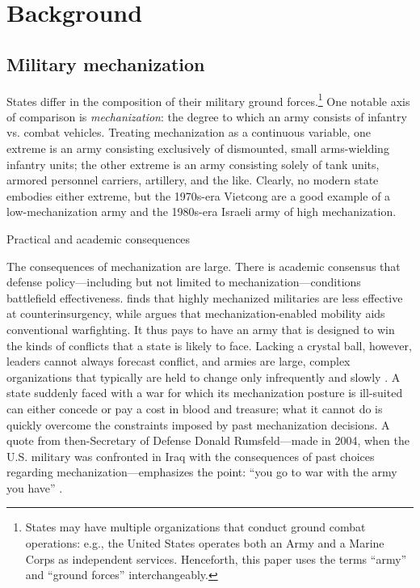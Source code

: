 \documentclass{article}
\begin{document}
\section{Background}

\subsection{Military mechanization}

States differ in the composition of their military ground forces.\footnote{States may have multiple organizations that
conduct ground combat operations: e.g., the United States operates both an Army
and a Marine Corps as independent services. Henceforth, this paper uses the
terms ``army'' and ``ground forces'' interchangeably.} One notable axis of comparison 
is \textit{mechanization}: the degree to which an army consists of infantry 
vs. combat vehicles. Treating mechanization as a continuous variable, 
one extreme is an army consisting exclusively of dismounted, small 
arms-wielding infantry units; the other extreme is an army consisting 
solely of tank units, armored personnel carriers, artillery, and the like.
Clearly, no modern state embodies either extreme, but the 1970s-era Vietcong are
a good example of a low-mechanization army and the 1980s-era Israeli army of
high mechanization.

Practical and academic consequences

The consequences of mechanization are large. There is
academic consensus that defense policy---including but not limited to
mechanization---conditions battlefield effectiveness. 
\citet{lyall2009rage} finds that highly mechanized militaries are less effective
at counterinsurgency, while \citet{biddle2004military} argues that
mechanization-enabled mobility aids conventional warfighting. It thus
pays to have an army that is designed to win the
kinds of
conflicts that a state is likely to face. Lacking a crystal ball, however,
leaders cannot always forecast conflict, and armies are large, complex
organizations that typically are held to change only infrequently and slowly
\citep{murray1998military,locher2004victory,zegart2000flawed}. A state suddenly faced with
a war for which its mechanization posture is ill-suited can either concede or
pay a cost in blood and treasure; what it cannot do is
quickly overcome the constraints imposed by past mechanization decisions. 
A quote from then-Secretary of Defense Donald Rumsfeld---made in 2004, when the U.S. military
was confronted in Iraq with the consequences of past choices regarding
mechanization---emphasizes the point:
``you go to war with the army you have'' \citep{schmitt_2004}. 
\end{document}
